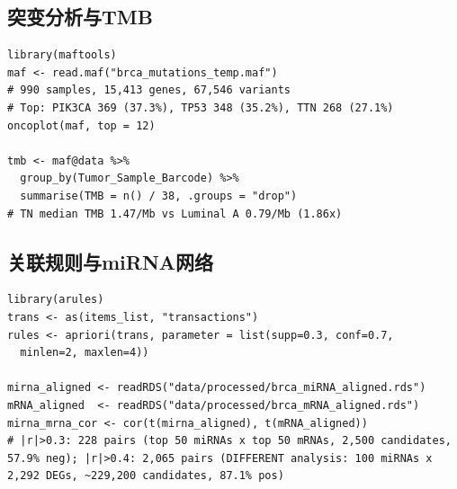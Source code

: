 \documentclass[12pt,a4paper]{ctexart}
\begin{document}
\subsection{突变分析与TMB}
\begin{lstlisting}[caption={maftools突变分析与TMB}, basicstyle=\ttfamily\scriptsize]
library(maftools)
maf <- read.maf("brca_mutations_temp.maf")
# 990 samples, 15,413 genes, 67,546 variants
# Top: PIK3CA 369 (37.3%), TP53 348 (35.2%), TTN 268 (27.1%)
oncoplot(maf, top = 12)

tmb <- maf@data %>%
  group_by(Tumor_Sample_Barcode) %>%
  summarise(TMB = n() / 38, .groups = "drop")
# TN median TMB 1.47/Mb vs Luminal A 0.79/Mb (1.86x)
\end{lstlisting}

\subsection{关联规则与miRNA网络}
\begin{lstlisting}[caption={Apriori关联规则与miRNA-mRNA相关}, basicstyle=\ttfamily\scriptsize]
library(arules)
trans <- as(items_list, "transactions")
rules <- apriori(trans, parameter = list(supp=0.3, conf=0.7,
  minlen=2, maxlen=4))

mirna_aligned <- readRDS("data/processed/brca_miRNA_aligned.rds")
mRNA_aligned  <- readRDS("data/processed/brca_mRNA_aligned.rds")
mirna_mrna_cor <- cor(t(mirna_aligned), t(mRNA_aligned))
# |r|>0.3: 228 pairs (top 50 miRNAs x top 50 mRNAs, 2,500 candidates, 57.9% neg); |r|>0.4: 2,065 pairs (DIFFERENT analysis: 100 miRNAs x 2,292 DEGs, ~229,200 candidates, 87.1% pos)
\end{lstlisting}
\end{document}

